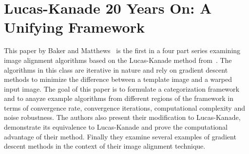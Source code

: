\documentclass[letterpaper]{article}
\date{\today}
\begin{document}
\maketitle

\section{Lucas-Kanade 20 Years On: A Unifying Framework}
This paper by Baker and Matthews~\cite{lk-20-yrs} is the first in a
four part series examining image alignment algorithms based on the
Lucas-Kanade method from~\cite{lk-81}.  The algorithms in this class
are iterative in nature and rely on gradient descent methods to
minimize the difference between a template image and a warped input
image.  The goal of this paper is to formulate a categorization
framework and to anayze example algorithms from different regions of
the framework in terms of convergence rate, convergence iterations,
computational complexity and noise robustness.  The authors also
present their modification to Lucas-Kanade, demonstrate its
equivalence to Lucas-Kanade and prove the computational advantage of
their method.  Finally they examine several examples of gradient
descent methods in the context of their image alignment technique.







\end{document}
